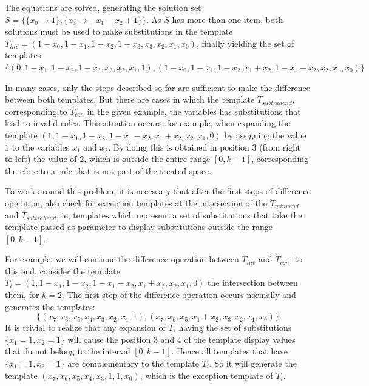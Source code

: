 \documentclass{llncs}
\begin{document}
The equations are solved, generating the solution set $S = \{\{x_0\to 1\},\{x_3\to -x_1-x_2+1\}\}$. As $S$ has more than one item, both solutions must be used to make substitutions in the template $T_{inv} = (1 - x_0, 1 - x_1, 1 - x_2, 1 - x_3, x_3, x_2, x_1, x_0)$, finally yielding the set of templates $\{(0, 1 - x_1, 1 - x_2, 1 - x_3, x_3, x_2, x_1, 1),(1 - x_0, 1 - x_1, 1 - x_2, x_1 + x_2, 1 - x_1 - x_2, x_2, x_1, x_0)\}$


In many cases, only the steps described so far are sufficient to make the difference between both templates. But there are cases in which the template $T_{subtrahend}$, corresponding to $T_{con}$ in the given example, the variables has substitutions that lead to invalid rules. This situation occurs, for example, when expanding the template $(1, 1 - x_1, 1 - x_2, 1 - x_1 - x_2, x_1 + x_2, x_2, x_1, 0)$ by assigning the value $1$ to the variables $x_1$ and $x_2$. By doing this is obtained in position $3$ (from right to left) the value of $2$, which is outside the entire range $[0, k-1]$, corresponding therefore to a rule that is not part of the treated space.

To work around this problem, it is necessary that after the first steps of difference operation, also check for exception templates at the intersection of the $T_{minuend}$ and $T_{subtrahend}$, ie, templates which represent a set of substitutions that take the template passed as parameter to display  substitutions outside the range $[0,k-1]$. %

For example, we will continue the difference operation between $T_{inv}$ and $T_{con}$; to this end, consider the template $T_i = (1, 1 - x_1, 1 - x_2, 1 - x_1 - x_2, x_1 + x_2, x_2, x_1, 0)$ the intersection between them, for $k=2$.
The first step of the difference operation occurs normally and generates the templates: 
\begin{displaymath}
\{(x_7, x_6, x_5, x_4, x_3, x_2, x_1, 1),(x_7, x_6, x_5, x_1 + x_2, x_3, x_2, x_1, x_0)\}
\end{displaymath}
It is trivial to realize that any expansion of $T_i$ having the set of substitutions $\{x_1 = 1, x_2 = 1\}$ will cause the position $3$ and $4$ of the template display values that do not belong to the interval $[0,k-1]$.
Hence all templates that have $\{x_1 = 1, x_2 = 1\}$ are complementary to the template $T_i$. So it will generate the template $(x_7, x_6, x_5, x_4, x_3, 1, 1, x_0)$, which is the exception template of $T_i$.
\end{document}
